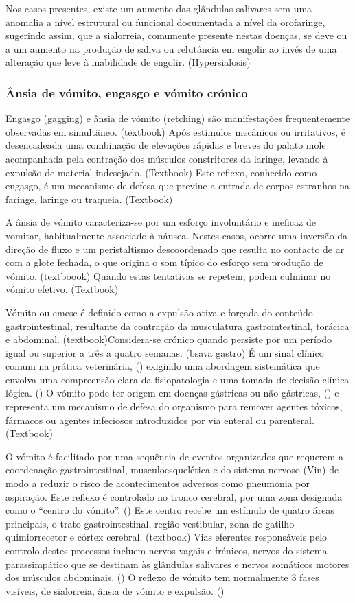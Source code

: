 Nos casos presentes, existe um aumento das glândulas salivares sem uma anomalia a nível estrutural ou funcional documentada a nível da orofaringe, sugerindo assim, que a sialorreia, comumente presente nestas doenças, se deve ou a um aumento na produção de saliva ou relutância em engolir ao invés de uma alteração que leve à inabilidade de engolir. (Hypersialosis)

\subsubsection{Ânsia de vómito, engasgo e vómito crónico}

Engasgo (gagging) e ânsia de vómito (retching) são manifestações frequentemente observadas em simultâneo. (textbook) 
Após estímulos mecânicos ou irritativos, é desencadeada uma combinação de elevações rápidas e breves do palato mole acompanhada pela contração dos músculos constritores da laringe, levando à expulsão de material indesejado. (Textbook) Este reflexo, conhecido como engasgo, é um mecanismo de defesa que previne a entrada de corpos estranhos na faringe, laringe ou traqueia. (Textbook)


A ânsia de vómito caracteriza-se por um esforço involuntário e ineficaz de vomitar, habitualmente associado à náusea. Nestes casos, ocorre uma inversão da direção de fluxo e um peristaltismo descoordenado que resulta no contacto de ar com a glote fechada, o que origina o som típico do esforço sem produção de vómito. (textboook) Quando estas tentativas se repetem, podem culminar no vómito efetivo. (Textbook)


Vómito ou emese é definido como a expulsão ativa e forçada do conteúdo gastrointestinal, resultante da contração da musculatura gastrointestinal, torácica e abdominal. (textbook)Considera-se crónico quando persiste por um período igual ou superior a três a quatro semanas. (bsava gastro) É um sinal clínico comum na prática veterinária, (\cite{VomitingReview}) exigindo uma abordagem sistemática que envolva uma compreensão clara da fisiopatologia e uma tomada de decisão clínica lógica. (\cite{Elwood2010}) O vómito pode ter origem em doenças gástricas ou não gástricas, (\cite{McGrotty2010}) e representa um mecanismo de defesa do organismo para remover agentes tóxicos, fármacos ou agentes infeciosos introduzidos por via enteral ou parenteral. (Textbook)


O vómito é facilitado por uma sequência de eventos organizados que requerem a coordenação gastrointestinal, musculoesquelética e do sistema nervoso (Vin) de modo a reduzir o risco de acontecimentos adversos como pneumonia por aspiração. Este reflexo é controlado no tronco cerebral, por uma zona designada como o “centro do vómito”. (\cite{Elwood2010}) Este centro recebe um estímulo de quatro áreas principais, o trato gastrointestinal, região vestibular, zona de gatilho quimiorrecetor  e córtex cerebral. (textbook) Vias eferentes responsáveis pelo controlo destes processos incluem nervos vagais e frénicos, nervos do sistema parassimpático que se destinam às glândulas salivares e nervos somáticos motores dos músculos abdominais. (\cite{Elwood2010}) O reflexo de vómito tem normalmente 3 fases visíveis, de sialorreia, ânsia de vómito e expulsão. (\cite{Elwood2010}) 


